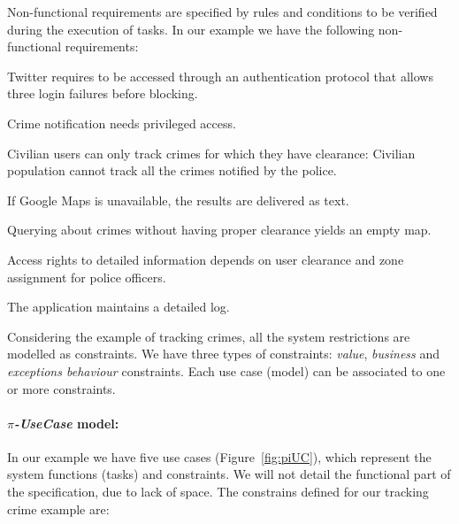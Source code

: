 Non-functional requirements are specified by rules and conditions to be verified during the execution of tasks.
In our example we have the following non-functional requirements:
\begin{numtrivlist}
\item Twitter requires to be accessed through an authentication protocol that allows three login failures before blocking. 
\item Crime notification needs privileged access.
\item Civilian users can only track crimes for which they have clearance: Civilian population cannot track all the crimes notified by the police. 
\item If \textsf{Google Maps} is unavailable, the results are delivered as text. 
\item Querying about crimes without having proper clearance yields an empty map.
\item Access rights to detailed information depends on user clearance and zone assignment for police officers. 
\item The application maintains a detailed log. 
\end{numtrivlist}

Considering the example of tracking crimes, all the system restrictions are
modelled as constraints. 
We have three types of constraints:
\textit{value}, \textit{business} and \textit{exceptions behaviour} constraints.
Each use case (model) can be associated to one or more constraints.

\paragraph*{\textit{$\pi$-UseCase} model:} 
In our example we have five use cases (Figure~\ref{fig:piUC}), which represent the
system functions (tasks) and constraints. 
We will not detail the functional part of the specification, due to lack of space.
The constrains defined for our tracking crime example are: 

